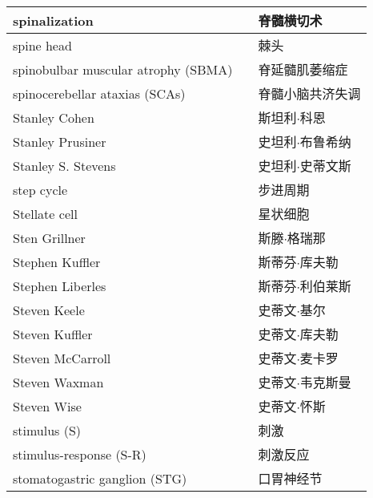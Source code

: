 \begin{longtable}{lll}
	\midrule
	spinalization   && 脊髓横切术 \\
	
	\midrule
	spine head   && 棘头 \\
	
	\midrule
	spinobulbar muscular atrophy (SBMA)   && 脊延髓肌萎缩症 \\
	
	\midrule
	spinocerebellar ataxias (SCAs)   && 脊髓小脑共济失调 \\
	
	\midrule
	Stanley Cohen   && 斯坦利$\cdot$科恩 \\
	
	\midrule
	Stanley Prusiner   && 史坦利$\cdot$布鲁希纳 \\
	
	\midrule
	Stanley S. Stevens   && 史坦利$\cdot$史蒂文斯 \\
	
	\midrule
	step cycle   && 步进周期 \\
	
	\midrule
	Stellate cell   && 星状细胞 \\
	
	\midrule
	Sten Grillner   && 斯滕$\cdot$格瑞那 \\
	
	\midrule
	Stephen Kuffler   && 斯蒂芬$\cdot$库夫勒 \\
	
	\midrule
	Stephen Liberles   && 斯蒂芬$\cdot$利伯莱斯 \\
	
	\midrule
	Steven Keele   && 史蒂文$\cdot$基尔 \\
	
	\midrule
	Steven Kuffler   && 史蒂文$\cdot$库夫勒 \\
	
	\midrule
	Steven McCarroll   && 史蒂文$\cdot$麦卡罗 \\
	
	\midrule
	Steven Waxman   && 史蒂文$\cdot$韦克斯曼 \\
	
	\midrule
	Steven Wise   && 史蒂文$\cdot$怀斯 \\
	
	\midrule
	stimulus (S)   && 刺激 \\
	
	\midrule
	stimulus-response (S-R)   && 刺激反应 \\
	
	\midrule
	stomatogastric ganglion  (STG)  && 口胃神经节 \\
	

\end{longtable}
